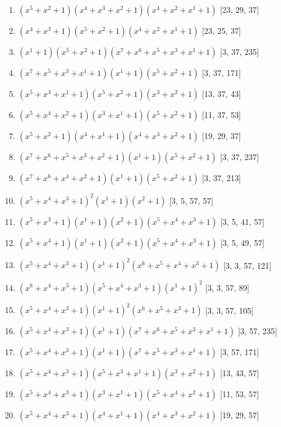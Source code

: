 \documentclass[10pt,twocolumn]{article}
\begin{document}
\begin{enumerate}
\item $(x^{5} + x^{2} + 1)(x^{4} + x^{3} + x^{2} + 1)(x^{4} + x^{2} + x^{1} + 1)$  [23, 29, 37]
\item $(x^{4} + x^{3} + 1)(x^{5} + x^{2} + 1)(x^{4} + x^{2} + x^{1} + 1)$  [23, 25, 37]
\item $(x^{1} + 1)(x^{5} + x^{2} + 1)(x^{7} + x^{6} + x^{5} + x^{3} + x^{1} + 1)$  [3, 37, 235]
\item $(x^{7} + x^{5} + x^{3} + x^{1} + 1)(x^{1} + 1)(x^{5} + x^{2} + 1)$  [3, 37, 171]
\item $(x^{5} + x^{3} + x^{1} + 1)(x^{5} + x^{2} + 1)(x^{3} + x^{2} + 1)$  [13, 37, 43]
\item $(x^{5} + x^{4} + x^{2} + 1)(x^{3} + x^{1} + 1)(x^{5} + x^{2} + 1)$  [11, 37, 53]
\item $(x^{5} + x^{2} + 1)(x^{4} + x^{1} + 1)(x^{4} + x^{3} + x^{2} + 1)$  [19, 29, 37]
\item $(x^{7} + x^{6} + x^{5} + x^{3} + x^{2} + 1)(x^{1} + 1)(x^{5} + x^{2} + 1)$  [3, 37, 237]
\item $(x^{7} + x^{6} + x^{4} + x^{2} + 1)(x^{1} + 1)(x^{5} + x^{2} + 1)$  [3, 37, 213]
\item $(x^{5} + x^{4} + x^{3} + 1)^{2}(x^{1} + 1)(x^{2} + 1)$  [3, 5, 57, 57]
\item $(x^{5} + x^{3} + 1)(x^{1} + 1)(x^{2} + 1)(x^{5} + x^{4} + x^{3} + 1)$  [3, 5, 41, 57]
\item $(x^{5} + x^{4} + 1)(x^{1} + 1)(x^{2} + 1)(x^{5} + x^{4} + x^{3} + 1)$  [3, 5, 49, 57]
\item $(x^{5} + x^{4} + x^{3} + 1)(x^{1} + 1)^{2}(x^{6} + x^{5} + x^{4} + x^{3} + 1)$  [3, 3, 57, 121]
\item $(x^{6} + x^{4} + x^{3} + 1)(x^{5} + x^{4} + x^{3} + 1)(x^{1} + 1)^{2}$  [3, 3, 57, 89]
\item $(x^{5} + x^{4} + x^{3} + 1)(x^{1} + 1)^{2}(x^{6} + x^{5} + x^{3} + 1)$  [3, 3, 57, 105]
\item $(x^{5} + x^{4} + x^{3} + 1)(x^{1} + 1)(x^{7} + x^{6} + x^{5} + x^{3} + x^{1} + 1)$  [3, 57, 235]
\item $(x^{5} + x^{4} + x^{3} + 1)(x^{1} + 1)(x^{7} + x^{5} + x^{3} + x^{1} + 1)$  [3, 57, 171]
\item $(x^{5} + x^{4} + x^{3} + 1)(x^{5} + x^{3} + x^{1} + 1)(x^{3} + x^{2} + 1)$  [13, 43, 57]
\item $(x^{5} + x^{4} + x^{3} + 1)(x^{3} + x^{1} + 1)(x^{5} + x^{4} + x^{2} + 1)$  [11, 53, 57]
\item $(x^{5} + x^{4} + x^{3} + 1)(x^{4} + x^{1} + 1)(x^{4} + x^{3} + x^{2} + 1)$  [19, 29, 57]

\end{enumerate}
\end{document}
